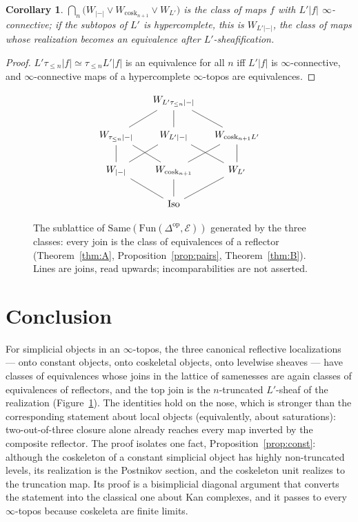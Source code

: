 \documentclass[11pt]{amsart}
\newtheorem{cor}[thm]{Corollary}
\theoremstyle{definition}
\newcommand{\Same}{\mathrm{Same}}
\newcommand{\Iso}{\mathrm{Iso}}
\newcommand{\cosk}{\mathrm{cosk}}
\newcommand{\Fun}{\mathrm{Fun}}
\newcommand{\E}{\mathcal E}
\newcommand{\tr}[1]{\tau_{\le #1}}
\newcommand{\re}{|{-}|}
\begin{document}
\begin{cor}
$\bigcap_n\bigl(W_{\re}\vee W_{\cosk_{n+1}}\vee W_{L'}\bigr)$
is the class of maps $f$ with $L'|f|$ $\infty$-connective; if the subtopos of
$L'$ is hypercomplete, this is $W_{L'\re}$, the class of maps whose realization
becomes an equivalence after $L'$-sheafification.
\end{cor}
\begin{proof}
$L'\tr n|f|\simeq\tr nL'|f|$ is an equivalence for all $n$ iff $L'|f|$ is
$\infty$-connective, and $\infty$-connective maps of a hypercomplete
$\infty$-topos are equivalences.
\end{proof}

\begin{figure}[ht]
\[
\begin{tikzcd}[row sep=normal, column sep=small]
& & W_{L'\tr n\re} & & \\
& W_{\tr n\re}\arrow[ur,dash] & W_{L'\re}\arrow[u,dash] & W_{\cosk_{n+1}L'}\arrow[ul,dash] & \\
& W_{\re}\arrow[u,dash]\arrow[ur,dash] & W_{\cosk_{n+1}}\arrow[ul,dash]\arrow[ur,dash] & W_{L'}\arrow[ul,dash]\arrow[u,dash] & \\
& & \Iso\arrow[ul,dash]\arrow[u,dash]\arrow[ur,dash] & &
\end{tikzcd}
\]
\caption{The sublattice of $\Same(\Fun(\Delta^{\mathrm{op}},\E))$ generated by
the three classes: every join is the class of equivalences of a reflector
(Theorem~\ref{thm:A}, Proposition~\ref{prop:pairs}, Theorem~\ref{thm:B}).
Lines are joins, read upwards; incomparabilities are not asserted.}\label{fig:lattice}
\end{figure}

\section{Conclusion}

For simplicial objects in an $\infty$-topos, the three canonical reflective
localizations --- onto constant objects, onto coskeletal objects, onto
levelwise sheaves --- have classes of equivalences whose joins in the lattice
of samenesses are again classes of equivalences of reflectors, and the top
join is the $n$-truncated $L'$-sheaf of the realization
(Figure~\ref{fig:lattice}). The identities hold on the nose, which is
stronger than the corresponding statement about local objects (equivalently,
about saturations): two-out-of-three closure alone already reaches every map
inverted by the composite reflector. The proof isolates one fact,
Proposition~\ref{prop:const}: although the coskeleton of a constant simplicial
object has highly non-truncated levels, its realization is the Postnikov
section, and the coskeleton unit realizes to the truncation map. Its proof is a
bisimplicial diagonal argument that converts the statement into the classical
one about Kan complexes, and it passes to every $\infty$-topos because
coskeleta are finite limits.
\end{document}
